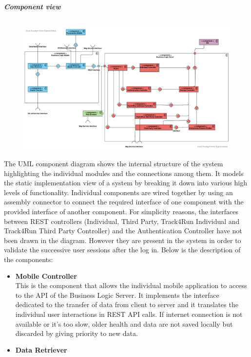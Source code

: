 \begin{legal}
		\item \textit{\textbf{Component view}}\\\\
		\begin{figure}[H]
		\includegraphics[width=\linewidth]{../images/design/ComponentDiagram.png}
		\end{figure}
		The UML component diagram shows the internal structure of the system highlighting the individual modules and the connections among them. It models the static implementation view of a system by breaking it down into various high levels of functionality.  Individual components are wired together by using an assembly connector to connect the required interface of one component with the provided interface of another component. For simplicity reasons, the interfaces between REST controllers (Individual, Third Party, Track4Run Individual and Track4Run Third Party Controller) and the Authentication Controller have not been drawn in the diagram. However they are present in the system in order to validate the successive user sessions after the log in. Below is the description of the components:\\
		\begin{itemize}
		\item{\textbf{Mobile Controller}\\
		This is the component that allows the individual mobile application to access to the API of the Business Logic Server. It implements the interface dedicated to the transfer of data from client to server and it translates the individual user interactions in REST API calls. If internet connection is not available or it's too slow, older health and data are not saved locally but discarded by giving priority to new data.
				}\\
		\item{\textbf{Data Retriever}\\
}
\end{itemize}
\end{legal}
